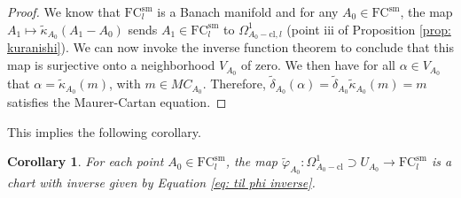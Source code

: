 \documentclass[11pt,a4paper]{amsart}
\theoremstyle{plain} %
\newtheorem{cor}[thm]{Corollary}
\theoremstyle{definition}
\theoremstyle{remark}
\newcommand{\mr}{\mathrm}
\newcommand{\til}{\widetilde}
\newcommand{\FC}{\mathrm{FC}}
\begin{document}
    \begin{proof}
    We know that $\FC^\mr{sm}_l$ is a Banach manifold and for any 
    $A_0 \in \FC^\mr{sm}$, the map $A_1 \mapsto \til\kappa_{A_0}(A_1 - A_0)$ sends $A_1 \in\FC^\mr{sm}_l$ to $\Omega^1_{A_0-\mr{cl},l}$ (point iii of Proposition \ref{prop: kuranishi}). We can now invoke the inverse function theorem to conclude that this map is surjective onto a neighborhood $V_{A_0}$ of zero. We then have for all $\alpha \in V_{A_0}$ that $\alpha = \til\kappa_{A_0}(m)$, with $m \in MC_{A_0}$. Therefore, $\til\delta_{A_0}(\alpha) = \til\delta_{A_0}\til\kappa_{A_0}(m) = m$ satisfies the Maurer-Cartan equation. %
\end{proof}
This implies the following corollary. 
\begin{cor}\label{cor: banach smoothness}
    For each point $A_0 \in \FC^{\mr{sm}}_l$, the map 
    $\til\varphi_{A_0}\colon \Omega^1_{A_0-\mr{cl}} \supset U_{A_0} \to \FC_l^\mr{sm}$
    is a chart with inverse given by Equation \eqref{eq: til phi inverse}. 
\end{cor}
\end{document}
